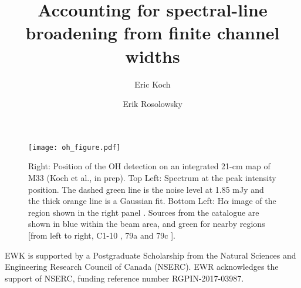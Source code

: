 \documentclass{rnaastex}
\begin{document}
\title{Accounting for spectral-line broadening from finite channel widths}

\author[0000-0001-9605-780X]{Eric Koch}
\author[0000-0002-5204-2259]{Erik Rosolowsky}


\keywords{}


\section{}

\begin{figure}[htp!]
\begin{center}
\texttt{[image: oh\_figure.pdf]}
\caption{\label{fig:1} Right: Position of the OH detection on an integrated 21-cm map of M33 (Koch et al., in prep). Top Left: Spectrum at the peak intensity position. The dashed green line is the noise level at 1.85 mJy and the thick orange line is a Gaussian fit. Bottom Left: H$\alpha$ image of the region shown in the right panel \citep{hodge1999}.  Sources from the \citet{moody2017} catalogue are shown in blue within the beam area, and green for nearby regions [from left to right, C1-10 \citep{moody2017}, 79a and 79c \citep{boul1974}].}
\end{center}
\end{figure}

\acknowledgments

EWK is supported by a Postgraduate Scholarship from the Natural Sciences and Engineering Research Council of Canada (NSERC). EWR acknowledges the support of NSERC, funding reference number RGPIN-2017-03987.

\software{}

\begin{thebibliography}{}

\end{thebibliography}
\end{document}
